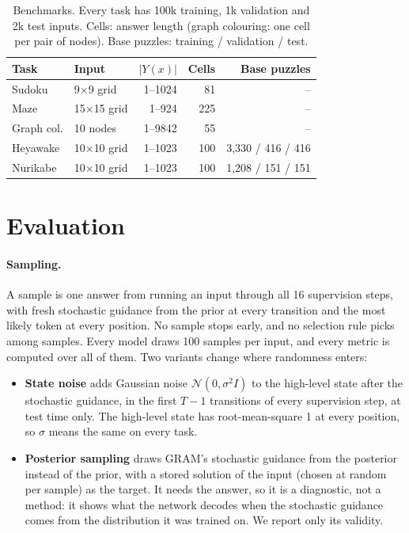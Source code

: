 \documentclass{article}
\newcommand{\Y}{|Y(x)|}
\begin{document}
\begin{table}[t]
\centering\small
\setlength{\tabcolsep}{3pt}
\begin{tabular}{@{}llrrr@{}}
\toprule
Task & Input & $\Y$ & Cells & Base puzzles \\
\midrule
Sudoku & 9$\times$9 grid & 1--1024 & 81 & -- \\
Maze & 15$\times$15 grid & 1--924 & 225 & -- \\
Graph col. & 10 nodes & 1--9842 & 55 & -- \\
Heyawake & 10$\times$10 grid & 1--1023 & 100 & 3{,}330 / 416 / 416 \\
Nurikabe & 10$\times$10 grid & 1--1023 & 100 & 1{,}208 / 151 / 151 \\
\bottomrule
\end{tabular}
\caption{Benchmarks. Every task has 100k training, 1k validation and 2k test inputs. Cells: answer length (graph
colouring: one cell per pair of nodes). Base puzzles: training / validation / test.}
\label{tab:data}
\end{table}

\section{Evaluation}
\label{sec:metrics}

\paragraph{Sampling.} A sample is one answer from running an input through all 16 supervision steps, with fresh
stochastic guidance from the prior at every transition and the most likely token at every position. No sample stops
early, and no selection rule picks among samples. Every model draws 100 samples per input, and every metric is
computed over all of them. Two variants change where randomness enters:
\begin{itemize}
  \item \textbf{State noise} adds Gaussian noise $\mathcal N(0,\sigma^2I)$ to the high-level state after the
  stochastic guidance, in the first $T-1$ transitions of every supervision step, at test time only. The high-level
  state has root-mean-square 1 at every position, so $\sigma$ means the same on every task.
  \item \textbf{Posterior sampling} draws GRAM's stochastic guidance from the posterior instead of the prior, with a
  stored solution of the input (chosen at random per sample) as the target. It needs the answer, so it is a
  diagnostic, not a method: it shows what the network decodes when the stochastic guidance comes from the distribution
  it was trained on. We report only its validity.
\end{itemize}
\end{document}
